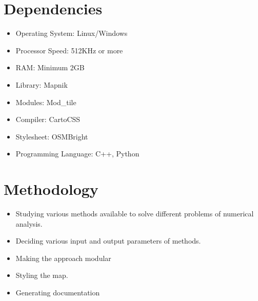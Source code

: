 \section{Dependencies}
\begin{itemize}
\item Operating System: Linux/Windows
\item Processor Speed: 512KHz or more
\item RAM: Minimum 2GB
\item Library: Mapnik
\item Modules: Mod\_tile
\item Compiler: CartoCSS
\item Stylesheet: OSMBright
\item Programming Language: C++, Python
\end{itemize}

\section{Methodology}
\begin{itemize}
\item Studying various methods available to solve different problems of numerical analysis.
\item Deciding various input and output parameters of methods.
\item Making the approach modular 
\item Styling the map.
\item Generating documentation
\end{itemize}

